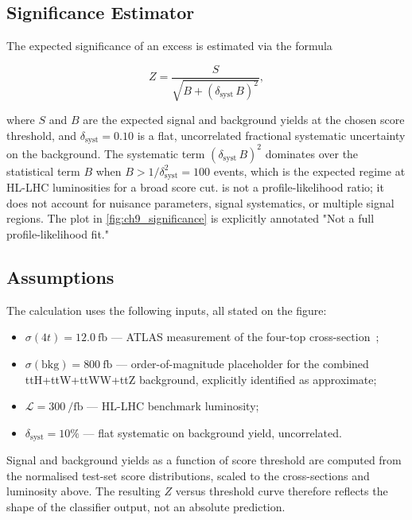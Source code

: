 \subsection{Significance Estimator}
\label{subsec:ch9_significance_formula}

The expected significance of an excess is estimated via the formula

\begin{equation}
  Z = \frac{S}{\sqrt{B + (\delta_{\mathrm{syst}}\, B)^2}},
  \label{eq:ch9_significance}
\end{equation}

where $S$ and $B$ are the expected signal and background yields at the chosen score
threshold, and $\delta_{\mathrm{syst}} = 0.10$ is a flat, uncorrelated fractional
systematic uncertainty on the background. The systematic term $(\delta_{\mathrm{syst}}\,B)^2$
dominates over the statistical term $B$ when $B > 1/\delta_{\mathrm{syst}}^2 = 100$
events, which is the expected regime at HL-LHC luminosities for a broad score cut.
 is not a profile-likelihood ratio; it does not account for
nuisance parameters, signal systematics, or multiple signal regions. The plot in
\cref{fig:ch9_significance} is explicitly annotated "Not a full profile-likelihood fit."

\subsection{Assumptions}
\label{subsec:ch9_assumptions}

The calculation uses the following inputs, all stated on the figure:

\begin{itemize}
  \item $\sigma(4t) = \SI{12.0}{\femto\barn}$ — ATLAS measurement of the four-top
        cross-section~\cite{collaborationObservationFourtopquarkProduction2023};
  \item $\sigma(\mathrm{bkg}) = \SI{800}{\femto\barn}$ — order-of-magnitude
        placeholder for the combined ttH+ttW+ttWW+ttZ background, explicitly
        identified as approximate;
  \item $\mathcal{L} = \SI{300}{\per\femto\barn}$ — HL-LHC benchmark luminosity;
  \item $\delta_{\mathrm{syst}} = 10\%$ — flat systematic on background yield, uncorrelated.
\end{itemize}

Signal and background yields as a function of score threshold are computed from the
normalised test-set score distributions, scaled to the cross-sections and luminosity
above. The resulting $Z$ versus threshold curve therefore reflects the shape of the
classifier output, not an absolute prediction.

